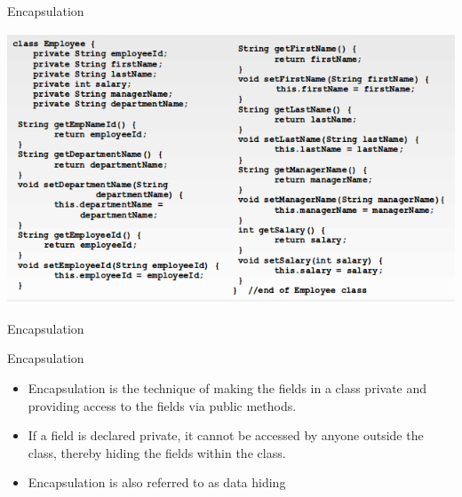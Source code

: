 \documentclass[14pt]{beamer}
\begin{document}
\begin{frame}{Encapsulation}
\begin{center}
\includegraphics[scale=0.5]{COJ-M01-S05-Image4.png}
\end{center}
\end{frame}

\begin{frame}{Encapsulation}
\begin{block}{}
Encapsulation
\end{block}
\begin{itemize}
\item Encapsulation is the technique of making the fields in a class private and providing access to the fields via public methods.
\item If a field is declared private, it cannot be accessed by anyone outside the class, thereby hiding the fields within the class.
\item Encapsulation is also referred to as data hiding
\end{itemize}

\end{frame}
\end{document}
